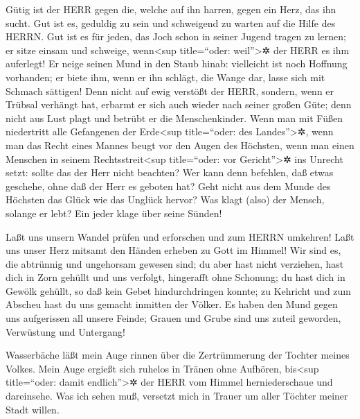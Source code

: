 Gütig ist der HERR gegen die, welche auf ihn harren,
gegen ein Herz, das ihn sucht. Gut ist es, geduldig zu
sein und schweigend zu warten auf die Hilfe des HERRN.
Gut ist es für jeden, das Joch schon in seiner Jugend
tragen zu lernen; er sitze einsam und schweige,
wenn\textless sup title=``oder: weil''\textgreater✲ der HERR es ihm
auferlegt! Er neige seinen Mund in den Staub hinab:
vielleicht ist noch Hoffnung vorhanden; er biete ihm,
wenn er ihn schlägt, die Wange dar, lasse sich mit Schmach sättigen!
Denn nicht auf ewig verstößt der HERR,
sondern, wenn er Trübsal verhängt hat, erbarmt er sich
auch wieder nach seiner großen Güte; denn nicht aus Lust
plagt und betrübt er die Menschenkinder. Wenn man mit
Füßen niedertritt alle Gefangenen der Erde\textless sup title=``oder:
des Landes''\textgreater✲, wenn man das Recht eines
Mannes beugt vor den Augen des Höchsten, wenn man einen
Menschen in seinem Rechtsstreit\textless sup title=``oder: vor
Gericht''\textgreater✲ ins Unrecht setzt: sollte das der Herr nicht
beachten? Wer kann denn befehlen, daß etwas geschehe,
ohne daß der Herr es geboten hat? Geht nicht aus dem
Munde des Höchsten das Glück wie das Unglück hervor? Was
klagt (also) der Mensch, solange er lebt? Ein jeder klage über seine
Sünden!

Laßt uns unsern Wandel prüfen und erforschen und zum
HERRN umkehren! Laßt uns unser Herz mitsamt den Händen
erheben zu Gott im Himmel! Wir sind es, die abtrünnig und
ungehorsam gewesen sind; du aber hast nicht verziehen,
hast dich in Zorn gehüllt und uns verfolgt, hingerafft
ohne Schonung; du hast dich in Gewölk gehüllt, so daß
kein Gebet hindurchdringen konnte; zu Kehricht und zum
Abscheu hast du uns gemacht inmitten der Völker. Es haben
den Mund gegen uns aufgerissen all unsere Feinde; Grauen
und Grube sind uns zuteil geworden, Verwüstung und Untergang!

Wasserbäche läßt mein Auge rinnen über die Zertrümmerung
der Tochter meines Volkes. Mein Auge ergießt sich ruhelos
in Tränen ohne Aufhören, bis\textless sup title=``oder:
damit endlich''\textgreater✲ der HERR vom Himmel herniederschaue und
dareinsehe. Was ich sehen muß, versetzt mich in Trauer um
aller Töchter meiner Stadt willen.

